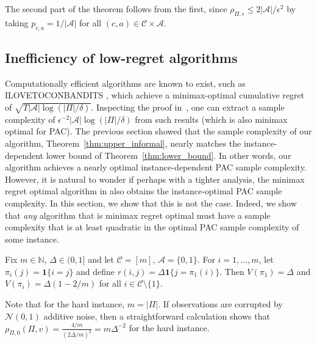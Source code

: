\documentclass{article}
\newcommand{\mc}[1]{\mathcal{#1}}
\newcommand{\zhaoqi}[1]{\textcolor{orange}{ZL:#1}}
\newcommand{\1}{\mathbf{1}}
\renewcommand{\v}{r} %
\begin{document}
The second part of the theorem follows from the first, since $\rho_{\Pi,\epsilon} \leq 2 |\mc{A}| /\epsilon^2$ by taking $p_{c,a} = 1/|\mc{A}|$ for all $(c,a) \in \mc{C}\times\mc{A}$.

\subsection{Inefficiency of low-regret algorithms}
Computationally efficient algorithms are known to exist, such as ILOVETOCONBANDITS \cite{agarwal2014taming}, which achieve a minimax-optimal cumulative regret of $\sqrt{ T |\mc{A}| \log( |\Pi| /\delta) }$.
Inspecting the proof in~\cite{agarwal2014taming}, one can extract a sample complexity of $\epsilon^{-2} |\mc{A}| \log(|\Pi|/\delta)$ from such results (which is also minimax optimal for PAC). 
The previous section showed that the sample complexity of our algorithm, Theorem~\ref{thm:upper_informal}, nearly matches the instance-dependent lower bound of Theorem~\ref{thm:lower_bound}. In other words, our algorithm achieves a nearly optimal instance-dependent PAC sample complexity. 
However, it is natural to wonder if perhaps with a tighter analysis, the minimax regret optimal algorithm in \cite{agarwal2014taming} also obtains the instance-optimal PAC sample complexity.
In this section, we show that this is not the case.
Indeed, we show that \emph{any} algorithm that is minimax regret optimal must have a sample complexity that is at least quadratic in the optimal PAC sample complexity of some instance. 

\begin{definition}\label{def:hard_instance}
Fix $m \in \mathbb{N}$, $\Delta \in (0,1]$ and let $\mc{C}=[m]$, $\mc{A} = \{0,1\}$. 
For $i=1,\dots,m$, let $\pi_i(j) = \1\{ i = j\}$ and define $\v(i,j) = \Delta \1\{ j = \pi_1(i) \}$. 
Then $V(\pi_1) = \Delta$ and $V(\pi_i)= \Delta( 1 - 2 / m)$ for all $i \in \mc{C} \setminus \{1\}$. 
\end{definition}

\noindent Note that for the hard instance, $m = |\Pi|$. If observations are corrupted by $\mc{N}(0,1)$ additive noise, then a straightforward calculation shows that $\rho_{\Pi,0}(\Pi, v) = \frac{4/m}{(2 \Delta / m)^2} = m \Delta^{-2}$ for the hard instance.
\end{document}
